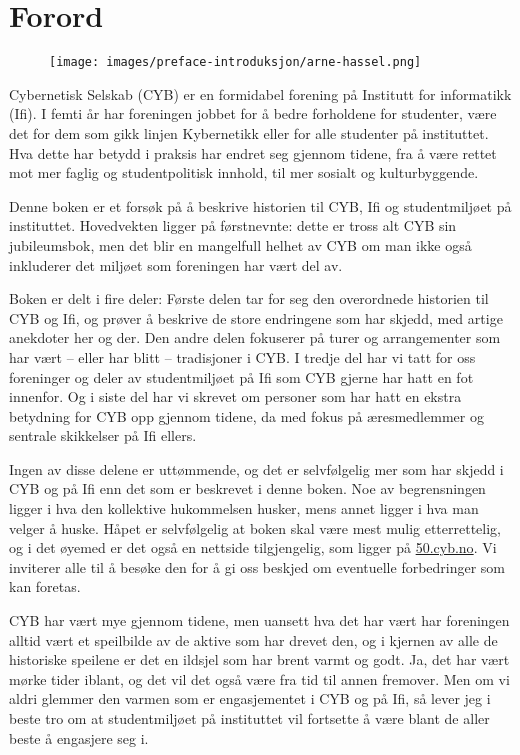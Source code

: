 \chapter*{Forord}

\author{Skrevet av Arne Hassel}

\begin{figure}
	\texttt{[image: images/preface-introduksjon/arne-hassel.png]}
	\label{fig:arne-hassel}
\end{figure}

Cybernetisk Selskab (CYB) er en formidabel forening på Institutt for informatikk (Ifi). I femti år har foreningen jobbet for å bedre forholdene for studenter, være det for dem som gikk linjen Kybernetikk eller for alle studenter på instituttet. Hva dette har betydd i praksis har endret seg gjennom tidene, fra å være rettet mot mer faglig og studentpolitisk innhold, til mer sosialt og kulturbyggende.

Denne boken er et forsøk på å beskrive historien til CYB, Ifi og studentmiljøet på instituttet. Hovedvekten ligger på førstnevnte: dette er tross alt CYB sin jubileumsbok, men det blir en mangelfull helhet av CYB om man ikke også inkluderer det miljøet som foreningen har vært del av.

Boken er delt i fire deler: Første delen tar for seg den overordnede historien til CYB og Ifi, og prøver å beskrive de store endringene som har skjedd, med artige anekdoter her og der. Den andre delen fokuserer på turer og arrangementer som har vært -- eller har blitt -- tradisjoner i CYB. I tredje del har vi tatt for oss foreninger og deler av studentmiljøet på Ifi som CYB gjerne har hatt en fot innenfor. Og i siste del har vi skrevet om personer som har hatt en ekstra betydning for CYB opp gjennom tidene, da med fokus på æresmedlemmer og sentrale skikkelser på Ifi ellers.

Ingen av disse delene er uttømmende, og det er selvfølgelig mer som har skjedd i CYB og på Ifi enn det som er beskrevet i denne boken. Noe av begrensningen ligger i hva den kollektive hukommelsen husker, mens annet ligger i hva man velger å huske. Håpet er selvfølgelig at boken skal være mest mulig etterrettelig, og i det øyemed er det også en nettside tilgjengelig, som ligger på \url{50.cyb.no}. Vi inviterer alle til å besøke den for å gi oss beskjed om eventuelle forbedringer som kan foretas.

CYB har vært mye gjennom tidene, men uansett hva det har vært har foreningen alltid vært et speilbilde av de aktive som har drevet den, og i kjernen av alle de historiske speilene er det en ildsjel som har brent varmt og godt. Ja, det har vært mørke tider iblant, og det vil det også være fra tid til annen fremover. Men om vi aldri glemmer den varmen som er engasjementet i CYB og på Ifi, så lever jeg i beste tro om at studentmiljøet på instituttet vil fortsette å være blant de aller beste å engasjere seg i.

